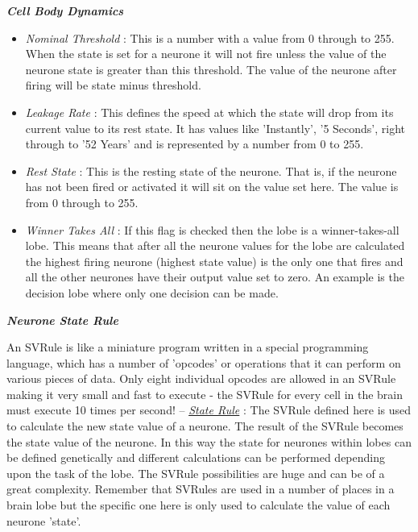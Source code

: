 \documentclass[11pt,twoside,a4paper]{article}
\begin{document}

\textbf{\textit{Cell Body Dynamics}}
\begin{itemize}
	\item[] \emph{Nominal Threshold} : This is a number with a value from 0 through to 255. When the state is set for a neurone it will not fire unless the value of the neurone state is greater than this threshold. The value of the neurone after firing will be state minus threshold.
	\item[] \emph{Leakage Rate} : This defines the speed at which the state will drop from its current value to its rest state. It has values like 'Instantly', '5 Seconds', right through to '52 Years' and is represented by a number from 0 to 255.
	\item[] \emph{Rest State} : This is the resting state of the neurone. That is, if the neurone has not been fired or activated it will sit on the value set here. The value is from 0 through to 255.
	\item[] \emph{Winner Takes All} : If this flag is checked then the lobe is a winner-takes-all lobe. This means that after all the neurone values for the lobe are calculated the highest firing neurone (highest state value) is the only one that fires and all the other neurones have their output value set to zero. An example is the decision lobe where only one decision can be made.
\end{itemize}
\clearpage

\textbf{\textit{Neurone State Rule}}

An SVRule is like a miniature program written in a special programming language, which has a number of 'opcodes' or operations that it can perform on various pieces of data. Only eight individual opcodes are allowed in an SVRule making it very small and fast to execute - the SVRule for every cell in the brain must execute 10 times per second! -- \emph{\underline{State Rule}} : The SVRule defined here is used to calculate the new state value of a neurone. The result of the SVRule becomes the state value of the neurone. In this way the state for neurones within lobes can be defined genetically and different calculations can be performed depending upon the task of the lobe. The SVRule possibilities are huge and can be of a great complexity. Remember that SVRules are used in a number of places in a brain lobe but the specific one here is only used to calculate the value of each neurone 'state'. %
\end{document}
